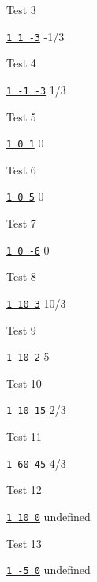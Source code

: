 Test 3
\begin{console}[commandchars=\\\{\}]
\underline{\texttt{1 1 -3}}
-1/3
\end{console}

Test 4
\begin{console}[commandchars=\\\{\}]
\underline{\texttt{1 -1 -3}}
1/3
\end{console}

Test 5
\begin{console}[commandchars=\\\{\}]
\underline{\texttt{1 0 1}}
0
\end{console}

Test 6
\begin{console}[commandchars=\\\{\}]
\underline{\texttt{1 0 5}}
0
\end{console}

Test 7
\begin{console}[commandchars=\\\{\}]
\underline{\texttt{1 0 -6}}
0
\end{console}

Test 8
\begin{console}[commandchars=\\\{\}]
\underline{\texttt{1 10 3}}
10/3
\end{console}

Test 9
\begin{console}[commandchars=\\\{\}]
\underline{\texttt{1 10 2}}
5
\end{console}

Test 10
\begin{console}[commandchars=\\\{\}]
\underline{\texttt{1 10 15}}
2/3
\end{console}

Test 11
\begin{console}[commandchars=\\\{\}]
\underline{\texttt{1 60 45}}
4/3
\end{console}

Test 12
\begin{console}[commandchars=\\\{\}]
\underline{\texttt{1 10 0}}
undefined
\end{console}

Test 13
\begin{console}[commandchars=\\\{\}]
\underline{\texttt{1 -5 0}}
undefined
\end{console}



